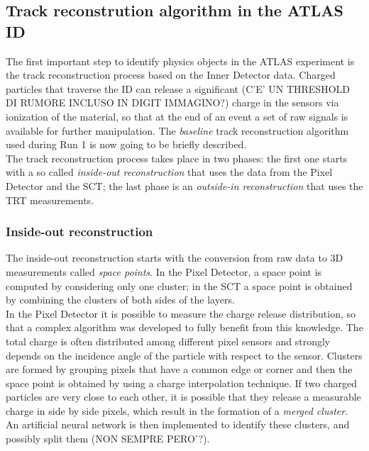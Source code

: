 \documentclass[a4paper,twoside,12pt]{article}
\begin{document}
\subsection{Track reconstrution algorithm in the ATLAS ID}
The first important step to identify physics objects in the ATLAS experiment is the track reconstruction process based on the Inner Detector data. Charged particles that
traverse the ID can release a significant (C'E' UN THRESHOLD DI RUMORE INCLUSO IN DIGIT IMMAGINO?) charge in the sensors via ionization of the material, so that at the end of an event a set
of raw signals is available for further manipulation. The \textit{baseline} track reconstruction
algorithm used during Run 1 is now going to be briefly described\cite{OptimizationTrackReconstructionAlgorithm}.\\

The track reconstruction process takes place in two phases: the first one starts with a so called \textit{inside-out reconstruction} that uses the data from the Pixel Detector and the SCT; the last phase is an \textit{outside-in reconstruction} that uses the TRT measurements. \\

\subsubsection*{Inside-out reconstruction}
The inside-out reconstruction starts with the conversion from raw data to 3D measurements called \textit{space points}. In the Pixel Detector, a space point is computed by
considering only one cluster; in the SCT a space point
is obtained by combining the clusters of both sides of the layers.  \\

In the Pixel Detector it is
possible to measure the charge release distribution, so that a complex algorithm was developed
to fully benefit from this knowledge.  
The total charge is often distributed among different pixel sensors and strongly depends on the 
incidence angle of the particle with respect to the sensor. Clusters are formed by grouping 
pixels that have a common edge or corner and then the space point is obtained by using a 
charge interpolation technique. If two charged particles are very close to each other, it is possible
that they release a measurable charge in side by side pixels, which result in the formation of
a \textit{merged cluster}. An artificial neural network is then implemented to identify these clusters, and possibly split them (NON SEMPRE PERO'?).\\
\end{document}
